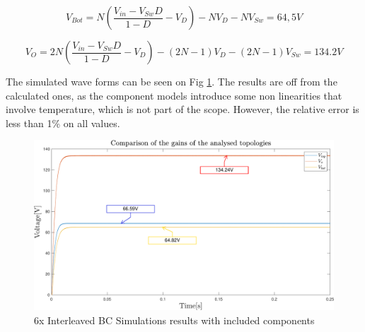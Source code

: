 \begin{equation}
	V_{Bot}= N(\frac{V_{in}-V_{Sw}D}{1-D}-V_D)-NV_D-NV_{Sw}= 64,5V
	\label{eq:DROPS_V_BOT_SIM}
\end{equation}

\begin{equation}
	V_{O}=2N(\frac{V_{in}-V_{Sw}D}{1-D}-V_D)-(2N-1)V_D-(2N-1)V_{Sw}= 134.2V
	\label{eq:DROPS_2INX_FINAL_SIM}
\end{equation}


The simulated wave forms can be seen on Fig \ref{fig:MBC_2NxSimResult_DROPS}. The results are off from the calculated ones, as the component models introduce some non linearities that involve temperature, which is not part of the scope. However, the relative error is less than 1\% on all values. 

\begin{figure}[H]
   \centering
   \includegraphics[width=\textwidth]{figures/zComponentDrops/compare_LTSpice.pdf}
    \caption{6x Interleaved BC Simulations results with included components}
	\label{fig:MBC_2NxSimResult_DROPS}
\end{figure}

